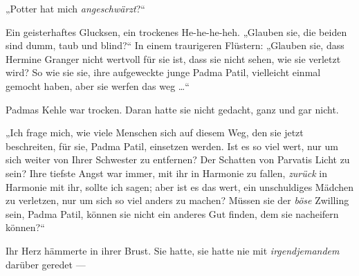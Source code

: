 „Potter hat mich \emph{angeschwärzt}?“

Ein geisterhaftes Glucksen, ein trockenes He-he-he-heh.
„Glauben sie, die beiden sind dumm, taub und blind?“ In einem traurigeren Flüstern:
„Glauben sie, dass Hermine Granger nicht wertvoll für sie ist, dass sie nicht sehen, wie sie verletzt wird? So wie sie sie, ihre aufgeweckte junge Padma Patil, vielleicht einmal gemocht haben, aber sie werfen das weg …“

Padmas Kehle war trocken. Daran hatte sie nicht gedacht, ganz und gar nicht.

„Ich frage mich, wie viele Menschen sich auf diesem Weg, den sie jetzt beschreiten, für sie, Padma Patil, einsetzen werden. Ist es so viel wert, nur um sich weiter von Ihrer Schwester zu entfernen? Der Schatten von Parvatis Licht zu sein? Ihre tiefste Angst war immer, mit ihr in Harmonie zu fallen, \emph{zurück} in Harmonie mit ihr, sollte ich sagen; aber ist es das wert, ein unschuldiges Mädchen zu verletzen, nur um sich so viel anders zu machen? Müssen sie der \emph{böse} Zwilling sein, Padma Patil, können sie nicht ein anderes Gut finden, dem sie nacheifern können?“

Ihr Herz hämmerte in ihrer Brust. Sie hatte, sie hatte nie mit \emph{irgendjemandem} darüber geredet —

